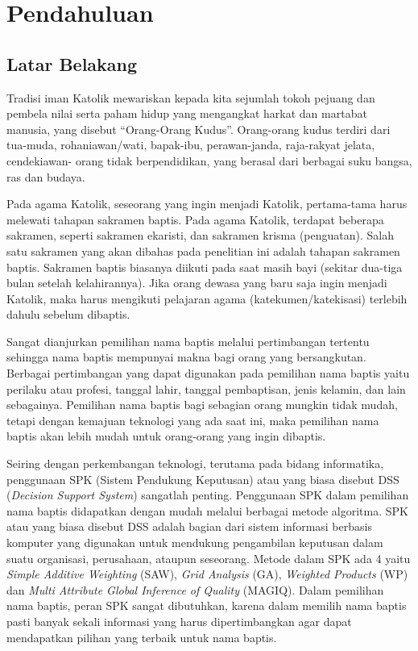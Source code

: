 \chapter{Pendahuluan}
\label{chap:pendahuluan}

\section{Latar Belakang}
\label{sec:latar_belakang}
Tradisi iman Katolik mewariskan kepada kita sejumlah tokoh pejuang dan pembela nilai serta paham hidup
yang mengangkat harkat dan martabat manusia, yang disebut ``Orang-Orang Kudus''\cite{latarbelakang1}. Orang-orang kudus
terdiri dari tua-muda, rohaniawan/wati, bapak-ibu, perawan-janda, raja-rakyat jelata, cendekiawan- orang
tidak berpendidikan, yang berasal dari berbagai suku bangsa, ras dan budaya.

Pada agama Katolik, seseorang yang ingin menjadi Katolik, pertama-tama harus melewati tahapan
sakramen baptis. Pada agama Katolik, terdapat beberapa sakramen, seperti sakramen ekaristi, dan sakramen krisma (penguatan). Salah satu sakramen yang akan
dibahas pada penelitian ini adalah tahapan sakramen baptis. Sakramen baptis biasanya diikuti pada saat
masih bayi (sekitar dua-tiga bulan setelah kelahirannya). Jika orang dewasa yang baru saja ingin menjadi
Katolik, maka harus mengikuti pelajaran agama (katekumen/katekisasi) terlebih dahulu sebelum dibaptis.

Sangat dianjurkan pemilihan nama baptis melalui pertimbangan tertentu sehingga nama baptis mempunyai makna bagi orang yang bersangkutan. Berbagai pertimbangan yang dapat digunakan pada pemilihan
nama baptis yaitu perilaku atau profesi, tanggal lahir, tanggal pembaptisan, jenis kelamin, dan lain sebagainya. Pemilihan nama baptis bagi sebagian orang mungkin tidak mudah, tetapi dengan kemajuan teknologi
yang ada saat ini, maka pemilihan nama baptis akan lebih mudah untuk orang-orang yang ingin dibaptis.

Seiring dengan perkembangan teknologi, terutama pada bidang informatika, penggunaan SPK (Sistem Pendukung Keputusan) atau yang biasa disebut DSS (\textit{Decision Support System}) sangatlah penting. Penggunaan
SPK dalam pemilihan nama baptis didapatkan dengan mudah melalui berbagai metode algoritma.
SPK atau yang biasa disebut DSS adalah bagian dari sistem informasi berbasis komputer yang digunakan
untuk mendukung pengambilan keputusan dalam suatu organisasi, perusahaan, ataupun seseorang. Metode
dalam SPK ada 4 yaitu \textit{Simple Additive Weighting} (SAW), \textit{Grid Analysis} (GA), \textit{Weighted Products} (WP)
dan \textit{Multi Attribute Global Inference of Quality} (MAGIQ). Dalam pemilihan nama baptis, peran SPK sangat
dibutuhkan, karena dalam memilih nama baptis pasti banyak sekali informasi yang harus dipertimbangkan
agar dapat mendapatkan pilihan yang terbaik untuk nama baptis.

